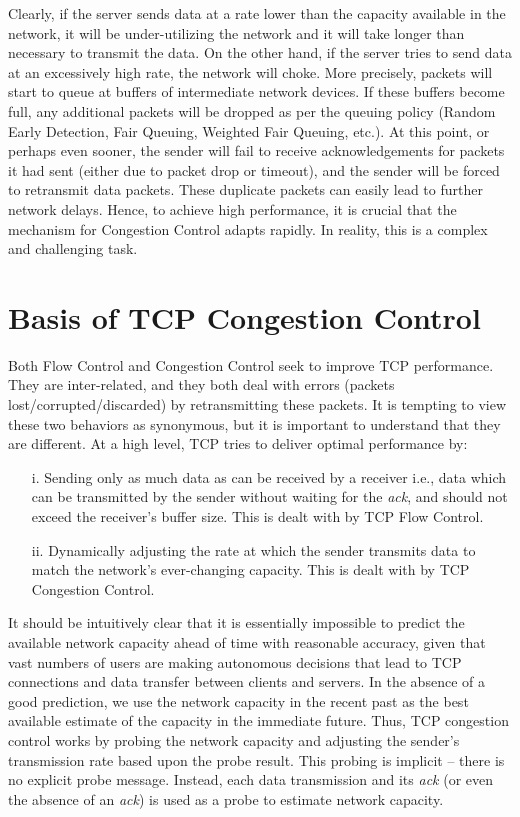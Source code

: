\begin{multicols}{2}
Clearly, if the server sends data at a rate lower than the capacity available in the network, it will be under-utilizing the network and it will take longer than necessary to transmit the data. On the other hand, if the server tries to send data at an excessively high rate, the network will choke. More precisely, packets will start to queue at buffers of intermediate network devices. If these buffers become full, any additional packets will be dropped as per the queuing policy (Random Early Detection, Fair Queuing, Weighted Fair Queuing, etc.). At this point, or perhaps even sooner, the sender will fail to receive acknowledgements for packets it had sent (either due to packet drop or timeout), and the sender will be forced to retransmit data packets. These duplicate packets can easily lead to further network delays. Hence, to achieve high performance, it is crucial that the mechanism for Congestion Control adapts rapidly. In reality, this is a complex and challenging task.

\section{Basis of TCP Congestion Control}

Both Flow Control and Congestion Control seek to improve TCP performance. They are inter-related, and they both deal with errors (packets lost/corrupted/discarded) by retransmitting these packets. It is tempting to view these two behaviors as synonymous, but it is important to understand that they are different. At a high level, TCP tries to deliver optimal performance by:
\begin{itemize}
\item[i.] Sending only as much data as can be received by a receiver i.e., data which can be transmitted by the sender without waiting for the \textit{ack}, and should not exceed the receiver’s buffer size. This is dealt with by TCP Flow Control.
\item[ii.]  Dynamically adjusting the rate at which the sender transmits data to match the network’s ever-changing capacity. This is dealt with by TCP Congestion Control.
\end{itemize}

It should be intuitively clear that it is essentially impossible to predict the available network capacity ahead of time with reasonable accuracy, given that vast numbers of users are making autonomous decisions that lead to TCP connections and data transfer between clients and servers. In the absence of a good prediction, we use the network capacity in the recent past as the best available estimate of the capacity in the immediate future. Thus, TCP congestion control works by probing the network capacity and adjusting the sender’s transmission rate based upon the probe result. This probing is implicit – there is no explicit probe message. Instead, each data transmission and its \textit{ack} (or even the absence of an \textit{ack}) is used as a probe to estimate network capacity.


\end{multicols}
